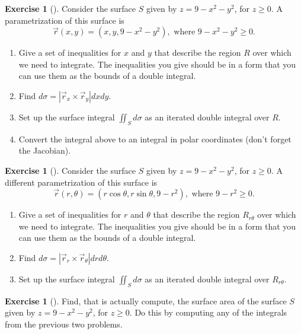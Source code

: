 \documentclass[10pt,]{book}
\theoremstyle{plain}
\theoremstyle{definition}
\theoremstyle{definition}
\theoremstyle{definition}
\theoremstyle{definition}
\newtheorem{exploration}[project]{Exercise}
\theoremstyle{definition}
\numberwithin{equation}{section}
\begin{document}
\begin{exploration}[]\label{exploration-275}
Consider the surface \(S\) given by \(z=9-x^2-y^2\), for \(z\geq 0\). A parametrization of this surface is%
\begin{equation*}
\vec r(x,y) = (x,y,9-x^2-y^2), \text{ where }  9-x^2-y^2\geq 0.
\end{equation*}
%
\begin{enumerate}[font=\bfseries,label=(\alph*),ref=\alph*]
\item\label{task-757} Give a set of inequalities for \(x\) and \(y\) that describe the region \(R\) over which we need to integrate. The inequalities you give should be in a form that you can use them as the bounds of a double integral.%
\item\label{task-758} Find \(d\sigma = \left|\vec r_x\times \vec r_y\right|dxdy\).%
\item\label{task-759} Set up the surface integral \(\iint_S d\sigma\) as an iterated double integral over \(R\).%
\item\label{task-760} Convert the integral above to an integral in polar coordinates (don't forget the Jacobian).%
\end{enumerate}
\end{exploration}
\begin{exploration}[]\label{exploration-276}
Consider the surface \(S\) given by \(z=9-x^2-y^2\), for \(z\geq 0\). A different parametrization of this surface is%
\begin{equation*}
\vec r(r,\theta) = (r\cos\theta,r\sin\theta,9-r^2), \text{ where }  9-r^2\geq 0.
\end{equation*}
%
\begin{enumerate}[font=\bfseries,label=(\alph*),ref=\alph*]
\item\label{task-761} Give a set of inequalities for \(r\) and \(\theta\) that describe the region \(R_{r\theta}\) over which we need to integrate. The inequalities you give should be in a form that you can use them as the bounds of a double integral.%
\item\label{task-762} Find \(d\sigma = \left|\vec r_r\times \vec r_\theta \right|drd\theta\).%
\item\label{task-763} Set up the surface integral \(\iint_S d\sigma\) as an iterated double integral over \(R_{r\theta}\).%
\end{enumerate}
\end{exploration}
\begin{exploration}[]\label{exploration-277}
Find, that is actually compute, the surface area of the surface \(S\) given by \(z=9-x^2-y^2\), for \(z\geq 0\). Do this by computing any of the integrals from the previous two problems.%
\end{exploration}
\end{document}
